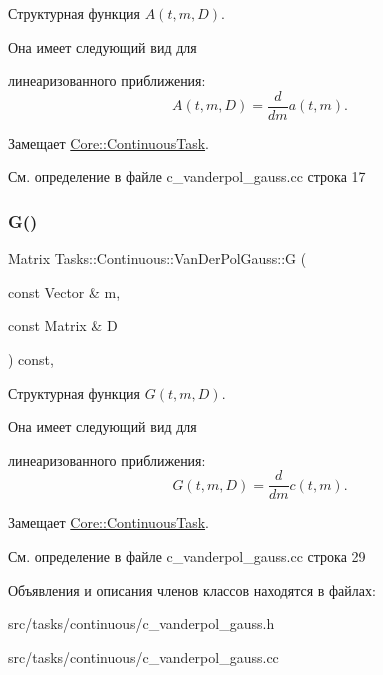 Структурная функция $A(t, m, D)$. 

Она имеет следующий вид для


\begin{DoxyItemize}
\item линеаризованного приближения\+: \[A(t, m, D) = \frac{d}{dm} a(t, m).\] 
\end{DoxyItemize}

Замещает \hyperlink{class_core_1_1_continuous_task_a75fbac1abe67223cd7938b724c5cce45}{Core\+::\+Continuous\+Task}.



См. определение в файле c\+\_\+vanderpol\+\_\+gauss.\+cc строка 17

\hypertarget{class_tasks_1_1_continuous_1_1_van_der_pol_gauss_a1b61ca6de96df17b049bc7934a241e47}{}\label{class_tasks_1_1_continuous_1_1_van_der_pol_gauss_a1b61ca6de96df17b049bc7934a241e47} 
\subsubsection{\texorpdfstring{G()}{G()}}
{\footnotesize\ttfamily Matrix Tasks\+::\+Continuous\+::\+Van\+Der\+Pol\+Gauss\+::G (\begin{DoxyParamCaption}\item[{const Vector \&}]{m,  }\item[{const Matrix \&}]{D }\end{DoxyParamCaption}) const\hspace{0.3cm}{\ttfamily [override]}, {\ttfamily [virtual]}}



Структурная функция $G(t, m, D)$. 

Она имеет следующий вид для


\begin{DoxyItemize}
\item линеаризованного приближения\+: \[G(t, m, D) = \frac{d}{dm} c(t, m).\] 
\end{DoxyItemize}

Замещает \hyperlink{class_core_1_1_continuous_task_a1b579e183ffa229f97048aadfd834517}{Core\+::\+Continuous\+Task}.



См. определение в файле c\+\_\+vanderpol\+\_\+gauss.\+cc строка 29



Объявления и описания членов классов находятся в файлах\+:\begin{DoxyCompactItemize}
\item 
src/tasks/continuous/c\+\_\+vanderpol\+\_\+gauss.\+h\item 
src/tasks/continuous/c\+\_\+vanderpol\+\_\+gauss.\+cc\end{DoxyCompactItemize}
